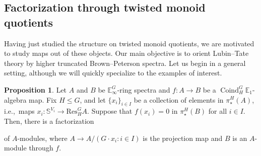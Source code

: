\documentclass[a4paper, 10pt]{article}
\newcommand{\E}{\mathbb E}  %
\newcommand{\Coind}{\operatorname{Coind}}
\theoremstyle{definition}
\newtheorem{proposition}[proposition]{Proposition}
\begin{document}
\subsection{Factorization through twisted monoid quotients}
Having just studied the structure on twisted monoid quotients, we are motivated to study maps out of these objects. Our main objective is to orient Lubin--Tate theory by higher truncated Brown--Peterson spectra. Let us begin in a general setting, although we will quickly specialize to the examples of interest.

\begin{proposition} \label{prop: factorization}
    Let \(A\) and \(B\) be \(\E^G_\infty\)-ring spectra and \(f\colon A\to B\) be a \( \Coind_H^G \mathbb{E}_{1}\)-algebra map. 
    Fix \(H\leq G\), and let \(\{x_i\}_{i\in I}\) be a collection of elements in \(\pi^H_\star(A)\), i.e.,~maps \(x_i\colon \mathbb{S}^{V_i}\to \mathrm{Res}^G_H A\).
    Suppose that \(f(x_i)=0\) in \(\pi^H_\star(B)\) for all \(i\in I\).
    Then, there is a factorization
    \begin{center}
    \end{center}
    of $A$-modules, where $A \to A/(G\cdot x_i : i\in I)$ is the projection map and $B$ is an $A$-module through $f$.
\end{proposition}
\end{document}
